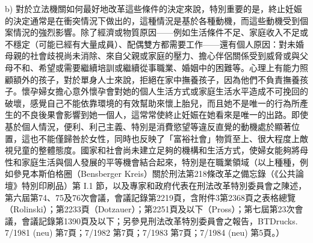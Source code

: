 \documentclass[12pt]{article}
\begin{document}
\begin{transpara}
b) 對於立法機關如何最好地改革這些條件的決定來說，特別重要的是，終止妊娠的決定通常是在衝突情況下做出的，這種情況是基於各種動機，而這些動機受到個案情況的強烈影響。除了經濟或物質原因——例如生活條件不足、家庭收入不足或不穩定（可能已經有大量成員）、配偶雙方都需要工作——還有個人原因：對未婚母親的社會歧視尚未消除、來自父親或家庭的壓力、擔心伴侶關係受到威脅或與父母不和、希望或需要繼續培訓或繼續從事職業、婚姻中的困難等。心理上有能力照顧額外的孩子，對於單身人士來說，拒絕在家中撫養孩子，因為他們不負責撫養孩子。懷孕婦女擔心意外懷孕會對她的個人生活方式或家庭生活水平造成不可挽回的破壞，感覺自己不能依靠環境的有效幫助來懷上胎兒，而且她不是唯一的行為所產生的不良後果會影響到她一個人，這常常使終止妊娠在她看來是唯一的出路。即使基於個人情況，便利、利己主義、特別是消費慾望等違反直覺的動機處於顯著位置，這也不能僅歸咎於女性，同時也反映了「富裕社會」物質至上、很大程度上敵視兒童的整體態度。國家和社會尚未建立足夠的機構和生活方式，使婦女能夠將母性和家庭生活與個人發展的平等機會結合起來，特別是在職業領域（以上種種，例如參見本斯伯格圈（Bensberger Kreis）關於刑法第218條改革之備忘錄（《公共論壇》特別印刷品）第 I.1 節，以及專家和政府代表在刑法改革特別委員會之陳述，第六屆第74、75及76次會議，會議記錄第2219頁，含附件3第2368頁之表格總覽（Rolinski）；第2233頁（Dotzauer）；第2251頁及以下（Pross）；第七屆第23次會議，會議記錄第1390頁及以下；另參見刑法改革特別委員會之報告，BTDrucks. 7/1981 (neu) 第7頁；7/1982 第7頁；7/1983 第7頁；7/1984 (neu) 第5頁。）
\end{transpara}
\end{document}
